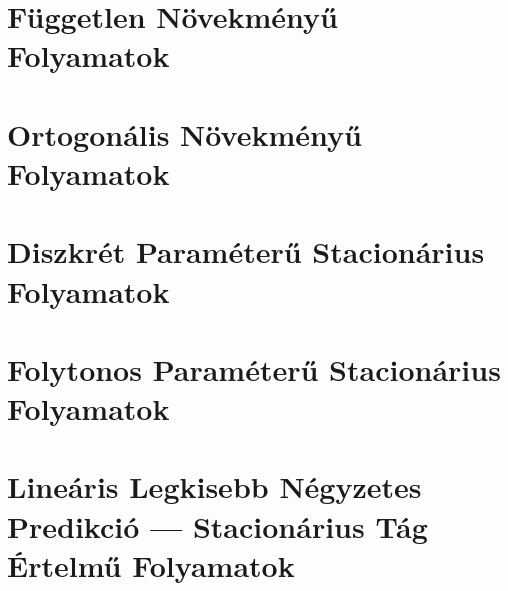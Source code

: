 \documentclass{article}
\begin{document}
\section{Független Növekményű Folyamatok}\label{sec:fuggetlennovekmenyufolyamatok}
\section{Ortogonális Növekményű Folyamatok}\label{sec:ortogonalisnovekmenyufolyamatok}
\section{Diszkrét Paraméterű Stacionárius Folyamatok}\label{sec:diszkretparameterustacionariusfolyamatok}
\section{Folytonos Paraméterű Stacionárius Folyamatok}\label{sec:folytonosparameterustacionariusfolyamatok}
\section{Lineáris Legkisebb Négyzetes Predikció --- Stacionárius Tág Értelmű Folyamatok}\label{sec:llsp}
\end{document}
